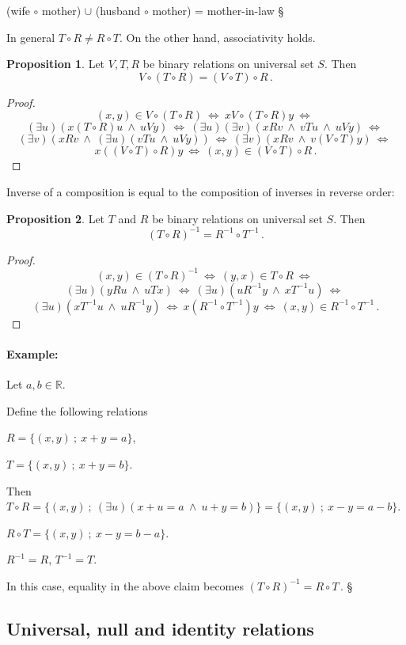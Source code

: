 \documentclass[11pt,paper=b5,footinclude,headinclude]{scrbook} %
\def\inn {{~\wedge~}}
\def\cee {{~\Leftrightarrow~}}
\def\zgled{\paragraph{Example:}}
\def\kz{{\hfill{\S}}}%
\theoremstyle{remark}
\theoremstyle{definition} %
\theoremstyle{theorem} %
\newtheorem*{proposition}{Proposition}
\begin{document}
(wife $\circ$ mother) $\cup$ (husband $\circ$ mother) = mother-in-law
\kz

\medskip
In general $T\circ R\neq R\circ T$. On the other hand, associativity holds.

\begin{proposition}
Let $V, T, R$ be binary relations on universal set $S$. Then
$$V\circ(T\circ R) = (V\circ T)\circ R\,.$$
\end{proposition}

\begin{proof}
$$(x,y)\in V\circ(T\circ R)\cee x V\circ(T\circ R) y
\cee$$
$$(\exists u)(x(T\circ R)u\inn uVy)
\cee (\exists u)(\exists v)(xRv\inn vTu\inn uVy)\cee $$
$$(\exists v)(xRv\inn (\exists u)(vTu\inn uVy))
\cee(\exists v)(xRv\inn v(V\circ T)y)\cee$$
$$x ((V\circ T)\circ R)y \cee (x,y)\in (V\circ T)\circ R\,.$$
\end{proof}

Inverse of a  composition is equal to the composition of inverses in reverse order:

\begin{proposition}
Let $T$ and $R$ be binary relations on universal set $S$. Then
$$(T\circ R)^{-1} = R^{-1}\circ T^{-1}\,.$$
\end{proposition}

\begin{proof}
$$(x,y)\in (T\circ R)^{-1} \cee (y,x)\in T\circ R
\cee$$
$$(\exists u)(yRu\inn uTx)
\cee (\exists u)(uR^{-1}y\inn xT^{-1}u)
\cee$$
$$(\exists u)(xT^{-1}u\inn uR^{-1}y)
\cee x (R^{-1}\circ T^{-1}) y\cee (x,y)\in R^{-1}\circ T^{-1}\,.$$
\end{proof}


\bigskip
\zgled

Let  $a,b\in\mathbb{R}$.

Define the following relations

$R = \{(x,y)~;~x+y = a\}$,

$T = \{(x,y)~;~x+y = b\}$.

Then
$T\circ R = \{(x,y)~;~(\exists u)(x+u = a\inn u+y = b)\}=\{(x,y)~;~x-y = a-b\}$.

$R\circ T = \{(x,y)~;~x-y = b-a\}$.

$R^{-1}= R$, $T^{-1} = T$.

In this case, equality in the above claim becomes
$(T\circ R)^{-1} = R \circ T\,.$
\kz



\subsection{Universal, null and identity relations}
\end{document}
